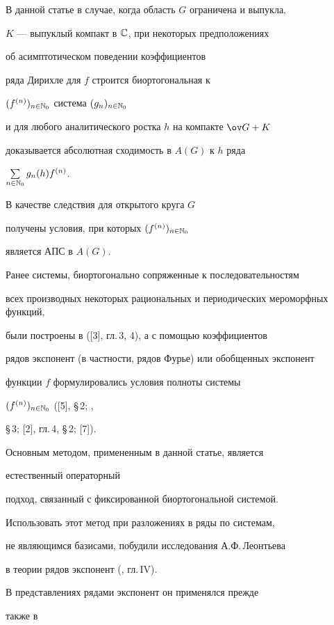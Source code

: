 В данной статье в случае, когда область $G$ ограничена и выпукла,


$K$ --- выпуклый компакт в $\Bbb C$, при некоторых предположениях 


об асимптотическом поведении коэффициентов


ряда Дирихле для $f$ строится биортогональная к


$(f^{(n)})_{n\in\Bbb N_0}$ система $(g_n)_{n\in\Bbb N_0}$


и для любого аналитического ростка $h$ на компакте $\ov G+K$


доказывается абсолютная сходимость в $A(G)$ к $h$ ряда


$\sum\limits_{n\in\Bbb N_0}g_n(h)f^{(n)}$.


В качестве следствия для открытого круга $G$


получены условия, при которых $(f^{(n)})_{n\in\Bbb N_0}$


является АПС в $A(G)$.





Ранее системы, биортогонально сопряженные к последовательностям


всех производных некоторых рациональных и периодических мероморфных функций,


были построены в ([3], гл.\,3, 4), а с помощью коэффициентов


рядов экспонент (в частности, рядов Фурье) или обобщенных экспонент


функции $f$ формулировались условия полноты системы 


$(f^{(n)})_{n\in\Bbb N_0}$ ([5], \S\,2; \cite{GROM2},


\S\,3; [2], гл.\,4, \S\,2; [7]).





Основным методом, примененным в данной статье, является


естественный операторный


подход, связанный с фиксированной биортогональной системой.


Использовать этот метод при разложениях в ряды по системам,


не являющимся базисами, побудили исследования А.Ф.\,Леонтьева


в теории рядов экспонент (\cite{LEO}, гл.\,IV).


В представлениях рядами экспонент он применялся прежде


также в


